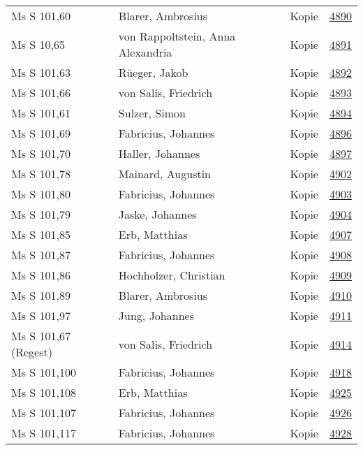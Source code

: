 \documentclass[10pt,a4paper,landscape]{report}
\begin{document}
\begin{longtable}{p{16cm}p{4cm}lr}
Ms S 101,60	&	Blarer, Ambrosius	&	Kopie	&	\href{http://130.60.24.72/assignment/4890}{4890}\\
Ms S 10,65	&	von Rappoltstein, Anna Alexandria	&	Kopie	&	\href{http://130.60.24.72/assignment/4891}{4891}\\
Ms S 101,63	&	Rüeger, Jakob	&	Kopie	&	\href{http://130.60.24.72/assignment/4892}{4892}\\
Ms S 101,66	&	von Salis, Friedrich	&	Kopie	&	\href{http://130.60.24.72/assignment/4893}{4893}\\
Ms S 101,61	&	Sulzer, Simon	&	Kopie	&	\href{http://130.60.24.72/assignment/4894}{4894}\\
Ms S 101,69	&	Fabricius, Johannes	&	Kopie	&	\href{http://130.60.24.72/assignment/4896}{4896}\\
Ms S 101,70	&	Haller, Johannes	&	Kopie	&	\href{http://130.60.24.72/assignment/4897}{4897}\\
Ms S 101,78	&	Mainard, Augustin	&	Kopie	&	\href{http://130.60.24.72/assignment/4902}{4902}\\
Ms S 101,80	&	Fabricius, Johannes	&	Kopie	&	\href{http://130.60.24.72/assignment/4903}{4903}\\
Ms S 101,79	&	Jaske, Johannes	&	Kopie	&	\href{http://130.60.24.72/assignment/4904}{4904}\\
Ms S 101,85	&	Erb, Matthias	&	Kopie	&	\href{http://130.60.24.72/assignment/4907}{4907}\\
Ms S 101,87	&	Fabricius, Johannes	&	Kopie	&	\href{http://130.60.24.72/assignment/4908}{4908}\\
Ms S 101,86	&	Hochholzer, Christian	&	Kopie	&	\href{http://130.60.24.72/assignment/4909}{4909}\\
Ms S 101,89	&	Blarer, Ambrosius	&	Kopie	&	\href{http://130.60.24.72/assignment/4910}{4910}\\
Ms S 101,97	&	Jung, Johannes	&	Kopie	&	\href{http://130.60.24.72/assignment/4911}{4911}\\
Ms S 101,67 (Regest)	&	von Salis, Friedrich	&	Kopie	&	\href{http://130.60.24.72/assignment/4914}{4914}\\
Ms S 101,100	&	Fabricius, Johannes	&	Kopie	&	\href{http://130.60.24.72/assignment/4918}{4918}\\
Ms S 101,108	&	Erb, Matthias	&	Kopie	&	\href{http://130.60.24.72/assignment/4925}{4925}\\
Ms S 101,107	&	Fabricius, Johannes	&	Kopie	&	\href{http://130.60.24.72/assignment/4926}{4926}\\
Ms S 101,117	&	Fabricius, Johannes	&	Kopie	&	\href{http://130.60.24.72/assignment/4928}{4928}\\

\end{longtable}
\end{document}
